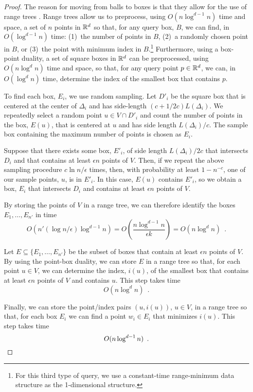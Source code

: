 \documentclass{patmorin}
\begin{document}
\begin{proof}
  The reason for moving from balls to boxes is that they allow for the
  use of range trees \cite{a,b,c}.  Range trees allow us to preprocess,
  using $O(n\log^{d-1} n)$ time and space, a set of $n$ points in $\mathbb{R}^d$
  so that, for any query box, $B$, we can find, in $O(\log^{d-1} n)$ time:
  (1)~the number of points in $B$, (2)~a randomly chosen point in $B$,
  or (3)~the point with minimum index in $B$.\footnote{For this third type
  of query, we use a constant-time range-minimum data structure \cite{x}
  as the 1-dimensional structure.} Furthermore, using a box-point duality,
  a set of square boxes in $\mathbb{R}^d$ can be preprocessed, using $O(n\log^d
  n)$ time and space, so that, for any query point $p\in\mathbb{R}^d$, we can,
  in $O(\log^d n)$ time, determine the index of the smallest box that
  contains $p$.

  To find each box, $E_i$, we use random sampling.  Let $D'_{i}$ be
  the square box that is centered at the center of $\Delta_i$ and has
  side-length $(c+1/2c)L(\Delta_i)$.  We repeatedly select a random point
  $u\in V\cap D'_{i}$ and count the number of points in the box, $E(u)$,
  that is centered at $u$ and has side length $L(\Delta_i)/c$.  The sample
  box containing the maximum number of points is chosen as $E_i$.

  Suppose that there exists some box, $E'_i$, of side length
  $L(\Delta_i)/2c$ that intersects $D_i$ and that contains at least
  $\epsilon n$ points of $V$.  Then, if we repeat the above sampling
  procedure $c\ln n/\epsilon$ times, then, with probability at least
  $1-n^{-c}$, one of our sample points, $u$, is in $E'_i$.  In this case,
  $E(u)$ contains $E'_i$, so we obtain a box, $E_i$ that intersects $D_i$
  and contains at least $\epsilon n$ points of $V$.

  By storing the points of $V$ in a range tree, we can therefore identify
  the boxes $E_1,\ldots,E_{n'}$ in time
  \[
     O(n'(\log n/\epsilon)\log^{d-1} n) 
        = O\left(\frac{n\log^{d-1}n}{\epsilon k} \right) = O(n\log^d n) \enspace .
  \]
 
  Let $E\subseteq\{E_1,\ldots,E_{n'}\}$ be the subset of boxes that
  contain at least $\epsilon n$ points of $V$. By using the point-box
  duality, we can store $E$ in a range tree so that, for each point
  $u\in V$, we can determine the index, $i(u)$, of the smallest box that
  contains at least $\epsilon n$ points of $V$ and contains $u$. This step
  takes time
  \[
     O(n\log^d n) \enspace .
  \]

  Finally, we can store the point/index pairs $(u,i(u))$, $u\in V$, in a
  range tree so that, for each box $E_i$ we can find a point $w_i\in E_i$
  that minimizes $i(u)$.  This step takes time
  \[
     O(n\log^{d-1} n) \enspace . \qedhere
  \]
  
\end{proof}
\end{document}
